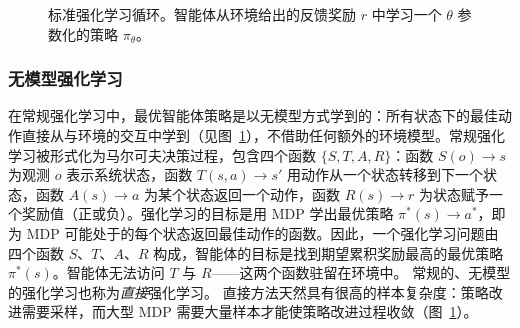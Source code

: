 %

\begin{figure}
  \begin{center}
    
    \caption{标准强化学习循环。智能体从环境给出的反馈奖励 $r$ 中学习一个 $\theta$ 参数化的策略 $\pi_\theta$。\citep{sutton2018reinforcement}}\label{fig:rl7b}
  \end{center}
\end{figure}

\subsubsection{无模型强化学习}
在常规强化学习中，最优智能体策略是以无模型方式学到的：所有状态下的最佳动作直接从与环境的交互中学到（见图~\ref{fig:rl7b}），不借助任何额外的环境模型。常规强化学习被形式化为马尔可夫决策过程，包含四个函数 $\{S, T, A, R\}$：函数 $S(o)\rightarrow s$ 为观测 $o$ 表示系统状态，函数 $T(s,a)\rightarrow s'$ 用动作从一个状态转移到下一个状态，函数 $A(s)\rightarrow a$ 为某个状态返回一个动作，函数 $R(s)\rightarrow r$ 为状态赋予一个奖励值（正或负）。强化学习的目标是用 MDP 学出最优策略 $\pi^*(s)\rightarrow a^*$，即为 MDP 可能处于的每个状态返回最佳动作的函数。因此，一个强化学习问题由四个函数 $S$、$T$、$A$、$R$ 构成，智能体的目标是找到期望累积奖励最高的最优策略 $\pi^*(s)$。智能体无法访问 $T$ 与 $R$——这两个函数驻留在环境中。%
常规的、无模型的强化学习也称为{\em 直接}强化学习。%
直接方法天然具有很高的样本复杂度：策略改进需要采样，而大型 MDP 需要大量样本才能使策略改进过程收敛（图~\ref{fig:rl7b}）。


